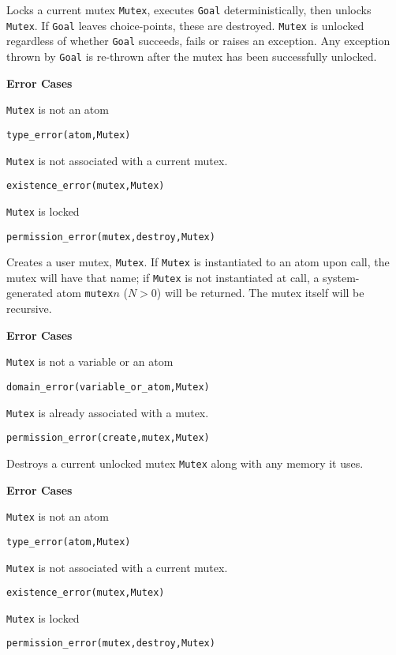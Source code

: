 \begin{description}
%
Locks a current mutex {\tt Mutex}, executes {\tt Goal}
deterministically, then unlocks {\tt Mutex}.  If {\tt Goal} leaves
choice-points, these are destroyed.  {\tt Mutex} is unlocked
regardless of whether {\tt Goal} succeeds, fails or raises an
exception. Any exception thrown by {\tt Goal} is re-thrown after the
mutex has been successfully unlocked.

{\bf Error Cases}
\bi
\item 	{\tt Mutex} is not an atom
\bi
\item 	{\tt type\_error(atom,Mutex)}
\ei
\item 	{\tt Mutex} is not associated with a current mutex.
\bi
\item 	{\tt existence\_error(mutex,Mutex)}
\ei
\item 	{\tt Mutex} is locked
\bi
\item 	{\tt permission\_error(mutex,destroy,Mutex)}
\ei
\ei

%
Creates a user mutex, {\tt Mutex}.  If {\tt Mutex} is instantiated to
an atom upon call, the mutex will have that name; if {\tt Mutex} is
not instantiated at call, a system-generated atom {\tt mutex}$n$
($N>0$) will be returned.  The mutex itself will be recursive.

{\bf Error Cases}
\bi
\item 	{\tt Mutex} is not a variable or an atom
\bi
\item 	{\tt domain\_error(variable\_or\_atom,Mutex)}
\ei
\item 	{\tt Mutex} is already associated with a mutex.
\bi
\item 	{\tt permission\_error(create,mutex,Mutex)}
\ei
\ei

%
Destroys a current unlocked mutex {\tt Mutex} along with any memory it
uses.

{\bf Error Cases}
\bi
\item 	{\tt Mutex} is not an atom
\bi
\item 	{\tt type\_error(atom,Mutex)}
\ei
\item 	{\tt Mutex} is not associated with a current mutex.
\bi
\item 	{\tt existence\_error(mutex,Mutex)}
\ei
\item 	{\tt Mutex} is locked
\bi
\item 	{\tt permission\_error(mutex,destroy,Mutex)}
\ei
\ei


\end{description}
